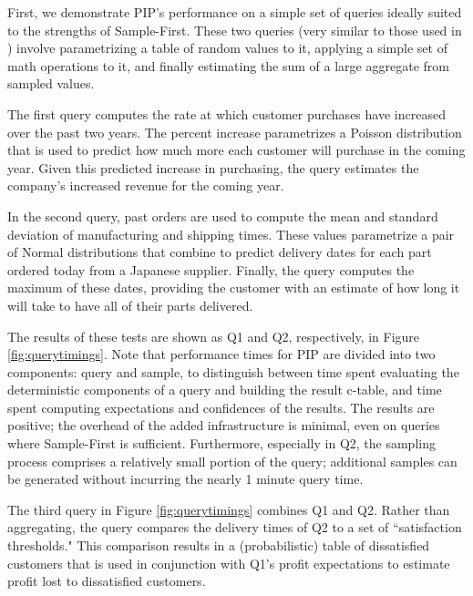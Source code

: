 First, we demonstrate PIP's performance on a simple set of queries ideally suited to the strengths of Sample-First.  These two queries (very similar to those used in \cite{MCDB}) involve pa\-ra\-me\-tri\-zing a table of random values to it, applying a simple set of math operations to it, and finally estimating the sum of a large aggregate from sampled values.  

The first query computes the rate at which customer purchases have increased over the past two years.  The percent increase parametrizes a Poisson distribution that is used to predict how much more each customer will purchase in the coming year.  Given this predicted increase in purchasing, the query estimates the company's increased revenue for the coming year.

In the second query, past orders are used to compute the mean and standard deviation of manufacturing and shipping times.  These values parametrize a pair of Normal distributions that combine to predict delivery dates for each part ordered today from a Japanese supplier.  Finally, the query computes the maximum of these dates, providing the customer with an estimate of how long it will take to have all of their parts delivered.

The results of these tests are shown as Q1 and Q2, respectively, in Figure \ref{fig:querytimings}.  Note that performance times for PIP are divided into two components: query and sample, to distinguish between time spent evaluating the deterministic components of a query and building the result c-table, and time spent computing expectations and confidences of the results.  The results are positive; the overhead of the added infrastructure is minimal, even on queries where Sample-First is sufficient.  Furthermore, especially in Q2, the sampling process comprises a relatively small portion of the query; additional samples can be generated without incurring the nearly 1 minute query time.

The third query in Figure \ref{fig:querytimings} combines Q1 and Q2.  Rather than aggregating, the query compares the delivery times of Q2 to a set of ``satisfaction thresholds."  This comparison results in a (probabilistic) table of dissatisfied customers that is used in conjunction with Q1's profit expectations to estimate profit lost to dissatisfied customers.  

